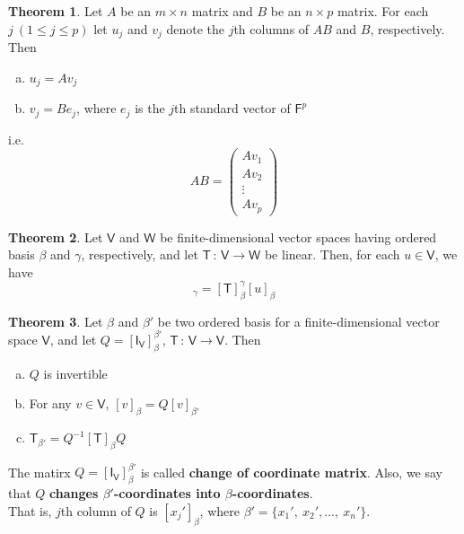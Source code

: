 \documentclass[12pt]{book}
\theoremstyle{definition}
\newtheorem{theorem}{Theorem}
\begin{document}
	\begin{theorem}
		Let $A$ be an $m\times n$ matrix and $B$ be an $n\times p$ matrix. For each $j\ (1\leq j\leq p)$ let $u_j$ and $v_j$ denote the $j$th columns of $AB$ and $B$, respectively. Then
		\begin{enumerate}[(a)]
			\item $u_j=Av_j$
			\item $v_j=Be_j$, where $e_j$ is the $j$th standard vector of $\mathsf{F}^p$
		\end{enumerate}
		i.e. \begin{equation*}
			AB=\begin{pmatrix}
				Av_1\\
				Av_2\\
				\vdots\\
				Av_p
			\end{pmatrix}
		\end{equation*}
	\end{theorem}
	\begin{theorem}
		Let $\mathsf{V}$ and $\mathsf{W}$ be finite-dimensional vector spaces having ordered basis $\beta$ and $\gamma$, respectively, and let $\mathsf{T}\,:\,\mathsf{V}\rightarrow\mathsf{W}$ be linear. Then, for each $u\in \mathsf{V}$, we have
		\begin{equation*}
			[\mathsf{T}(u)]_\gamma=[\mathsf{T}]_\beta^\gamma[u]_\beta
		\end{equation*}
	\end{theorem}
	\begin{theorem}
		Let $\beta$ and $\beta'$ be two ordered basis for a finite-dimensional vector space $\mathsf{V}$, and let $Q=[\mathsf{I}_\mathsf{V}]_\beta^{\beta'}$, $\mathsf{T}\,:\,\mathsf{V}\rightarrow\mathsf{V}$. Then
		\begin{enumerate}[(a)]
			\item $Q$ is invertible
			\item For any $v\in \mathsf{V}$, $[v]_\beta=Q[v]_{\beta'}$
			\item $\mathsf{T}_{\beta'}=Q^{-1}[\mathsf{T}]_\beta Q$
		\end{enumerate}
	\end{theorem}
	\indent The matirx $Q=[\mathsf{I}_\mathsf{V}]_\beta^{\beta'}$ is called \textbf{change of coordinate matrix}. Also, we say that $Q$ \textbf{changes $\beta'$-coordinates into $\beta$-coordinates}.\\
	That is, $j$th column of $Q$ is $[x_j']_{\beta}$, where $\beta'=\{x_1',\ x_2',...,\ x_n'\}$.
	\setcounter{chapter}{4}
\end{document}
